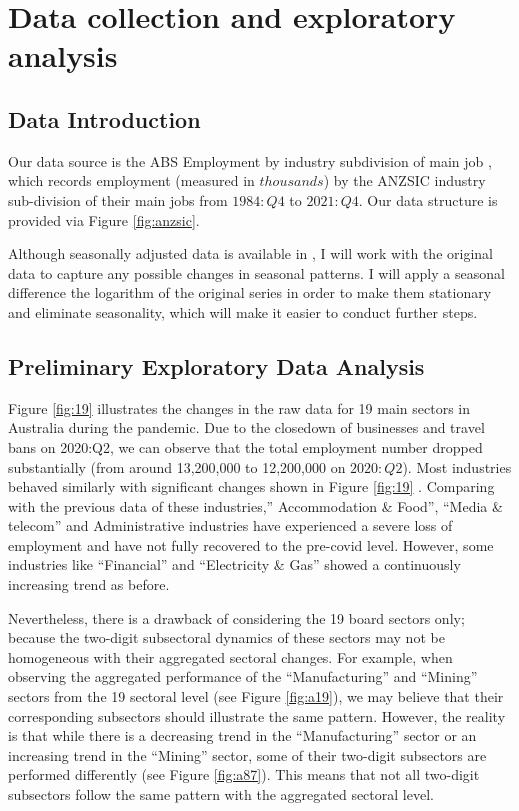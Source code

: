 \documentclass{monashthesis}
\begin{document}
\hypertarget{data-collection-and-exploratory-analysis}{%
\chapter{Data collection and exploratory analysis}\label{data-collection-and-exploratory-analysis}}

\hypertarget{data-introduction}{%
\section{Data Introduction}\label{data-introduction}}

Our data source is the ABS Employment by industry subdivision of main job \autocite{ABS2022}, which records employment (measured in \(thousands\)) by the ANZSIC industry sub-division of their main jobs from \(1984:Q4\) to \(2021:Q4\). Our data structure is provided via Figure \ref{fig:anzsic}.

Although seasonally adjusted data is available in \autocite{ABS2022}, I will work with the original data to capture any possible changes in seasonal patterns. I will apply a seasonal difference the logarithm of the original series in order to make them stationary and eliminate seasonality, which will make it easier to conduct further steps.

\hypertarget{preliminary-exploratory-data-analysis}{%
\section{Preliminary Exploratory Data Analysis}\label{preliminary-exploratory-data-analysis}}

\newpage

Figure \ref{fig:19} illustrates the changes in the raw data for 19 main sectors in Australia during the pandemic. Due to the closedown of businesses and travel bans on 2020:Q2, we can observe that the total employment number dropped substantially (from around 13,200,000 to 12,200,000 on \(2020:Q2\)). Most industries behaved similarly with significant changes shown in Figure \ref{fig:19} . Comparing with the previous data of these industries,'' Accommodation \& Food'', ``Media \& telecom'' and Administrative industries have experienced a severe loss of employment and have not fully recovered to the pre-covid level. However, some industries like ``Financial'' and ``Electricity \& Gas'' showed a continuously increasing trend as before.

Nevertheless, there is a drawback of considering the 19 board sectors only; because the two-digit subsectoral dynamics of these sectors may not be homogeneous with their aggregated sectoral changes. For example, when observing the aggregated performance of the ``Manufacturing'' and ``Mining'' sectors from the 19 sectoral level (see Figure \ref{fig:a19}), we may believe that their corresponding subsectors should illustrate the same pattern. However, the reality is that while there is a decreasing trend in the ``Manufacturing'' sector or an increasing trend in the ``Mining'' sector, some of their two-digit subsectors are performed differently (see Figure \ref{fig:a87}). This means that not all two-digit subsectors follow the same pattern with the aggregated sectoral level.
\end{document}
